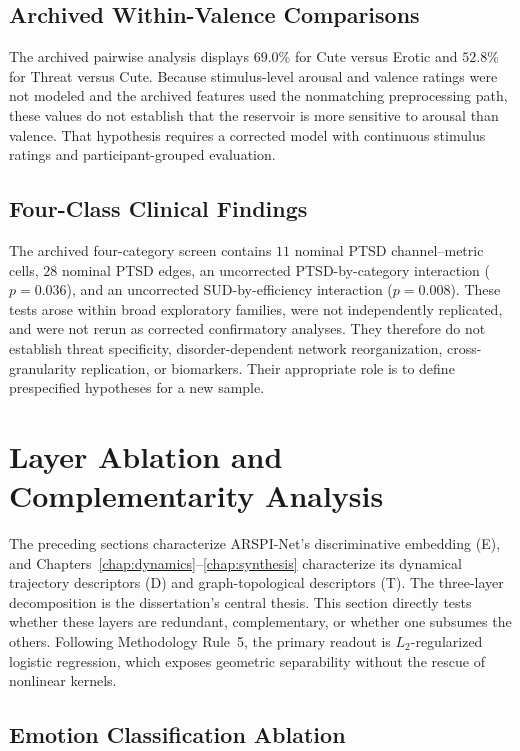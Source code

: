 \subsection{Archived Within-Valence Comparisons}

The archived pairwise analysis displays $69.0\%$ for Cute versus Erotic and $52.8\%$ for Threat versus Cute. Because stimulus-level arousal and valence ratings were not modeled and the archived features used the nonmatching preprocessing path, these values do not establish that the reservoir is more sensitive to arousal than valence. That hypothesis requires a corrected model with continuous stimulus ratings and participant-grouped evaluation.

\subsection{Four-Class Clinical Findings}

The archived four-category screen contains $11$ nominal PTSD channel--metric cells, $28$ nominal PTSD edges, an uncorrected PTSD-by-category interaction ($p=0.036$), and an uncorrected SUD-by-efficiency interaction ($p=0.008$). These tests arose within broad exploratory families, were not independently replicated, and were not rerun as corrected confirmatory analyses. They therefore do not establish threat specificity, disorder-dependent network reorganization, cross-granularity replication, or biomarkers. Their appropriate role is to define prespecified hypotheses for a new sample.


\section{Layer Ablation and Complementarity Analysis}
\label{sec:ch5_ablation}

The preceding sections characterize ARSPI-Net's discriminative embedding (E), and Chapters~\ref{chap:dynamics}--\ref{chap:synthesis} characterize its dynamical trajectory descriptors (D) and graph-topological descriptors (T). The three-layer decomposition is the dissertation's central thesis. This section directly tests whether these layers are redundant, complementary, or whether one subsumes the others. Following Methodology Rule~5, the primary readout is $L_2$-regularized logistic regression, which exposes geometric separability without the rescue of nonlinear kernels.

\subsection{Emotion Classification Ablation}

